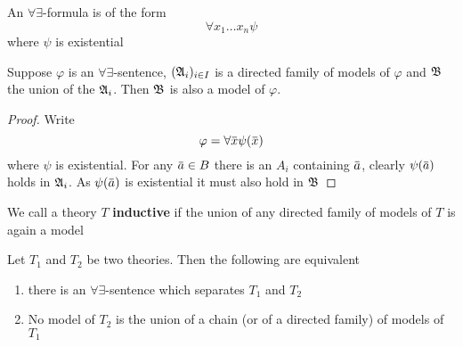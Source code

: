 \documentclass[11pt]{article}
\begin{document}
An \(\forall\exists\)-formula is of the form
\begin{equation*}
\forall x_1\dots x_n\psi
\end{equation*}
where \(\psi\) is existential
\begin{lemma}[]
\label{lemma3.1.6}
Suppose \(\varphi\) is an \(\forall\exists\)-sentence, \((\mathfrak{A}_i)_{i\in I}\) is a
directed family of models of \(\varphi\) and \(\mathfrak{B}\) the union of the \(\mathfrak{A}_i\). Then
\(\mathfrak{B}\) is also a model of \(\varphi\).
\end{lemma}

\begin{proof}
Write
\begin{equation*}
\varphi=\forall\bbar{x}\psi(\bbar{x})
\end{equation*}
where \(\psi\) is existential. For any \(\bbar{a}\in B\) there is an \(A_i\)
containing \(\bbar{a}\), clearly \(\psi(\bbar{a})\) holds in \(\mathfrak{A}_i\). As
\(\psi(\bbar{a})\) is existential it must also hold in \(\mathfrak{B}\)
\end{proof}

\begin{definition}[]
We call a theory \(T\) \textbf{inductive} if the union of any directed family of
models of \(T\) is again a model
\end{definition}

\begin{theorem}[]
\label{thm3.1.8}
Let \(T_1\) and \(T_2\) be two theories. Then the following are equivalent
\begin{enumerate}
\item there is an \(\forall\exists\)-sentence which separates \(T_1\) and \(T_2\)
\item No model of \(T_2\) is the union of a chain (or of a directed family) of
models of \(T_1\)
\end{enumerate}
\end{theorem}
\end{document}
